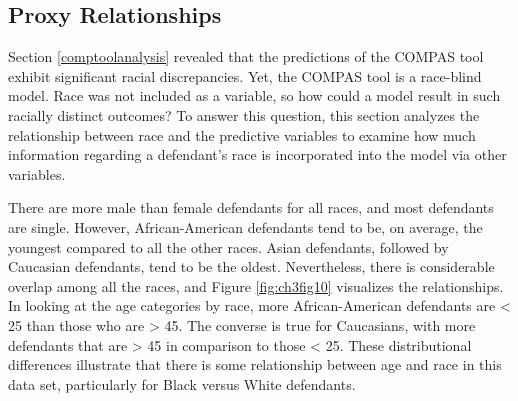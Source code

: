 \documentclass[12pt, twoside]{amherstthesis}
\begin{document}
\hypertarget{proxy-relationships}{%
\subsection{Proxy Relationships}\label{proxy-relationships}}

Section \ref{comptoolanalysis} revealed that the predictions of the COMPAS tool exhibit significant racial discrepancies. Yet, the COMPAS tool is a race-blind model. Race was not included as a variable, so how could a model result in such racially distinct outcomes? To answer this question, this section analyzes the relationship between race and the predictive variables to examine how much information regarding a defendant's race is incorporated into the model via other variables.

There are more male than female defendants for all races, and most defendants are single. However, African-American defendants tend to be, on average, the youngest compared to all the other races. Asian defendants, followed by Caucasian defendants, tend to be the oldest. Nevertheless, there is considerable overlap among all the races, and Figure \ref{fig:ch3fig10} visualizes the relationships. In looking at the age categories by race, more African-American defendants are \textless{} 25 than those who are \textgreater{} 45. The converse is true for Caucasians, with more defendants that are \textgreater{} 45 in comparison to those \textless{} 25. These distributional differences illustrate that there is some relationship between age and race in this data set, particularly for Black versus White defendants.
\end{document}
